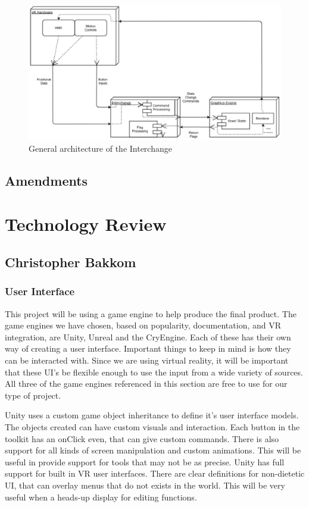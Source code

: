 \documentclass[onecolumn, draftclsnofoot,10pt, compsoc]{IEEEtran}
\newcounter{threesection}[subsubsection]
\begin{document}
\begin{figure}[H]
\begin{center}
\includegraphics[width=\textwidth]{Interchange.eps}
\caption{General architecture of the Interchange}
\end{center}
\end{figure}


\subsection{Amendments}


\pagebreak
\section{Technology Review}

\subsection{Christopher Bakkom}
\subsubsection{User Interface}
This project will be using a game engine to help produce the final product. The game engines we have chosen, based on popularity, documentation, and VR integration, are Unity, Unreal and the CryEngine. Each of these has their own way of creating a user interface. Important things to keep in mind is how they can be interacted with. Since we are using virtual reality, it will be important that these UI's be flexible enough to use the input from a wide variety of sources. All three of the game engines referenced in this section are free to use for our type of project.

Unity uses a custom game object inheritance to define it's user interface models. The objects created can have custom visuals and interaction. Each button in the toolkit has an onClick even, that can give custom commands. There is also support for all kinds of screen manipulation and custom animations. This will be useful in provide support for tools that may not be as precise. Unity has full support for built in VR user interfaces. There are clear definitions for non-dietetic UI, that can overlay menus that do not exists in the world. This will be very useful when a heads-up display for editing functions.
\end{document}
